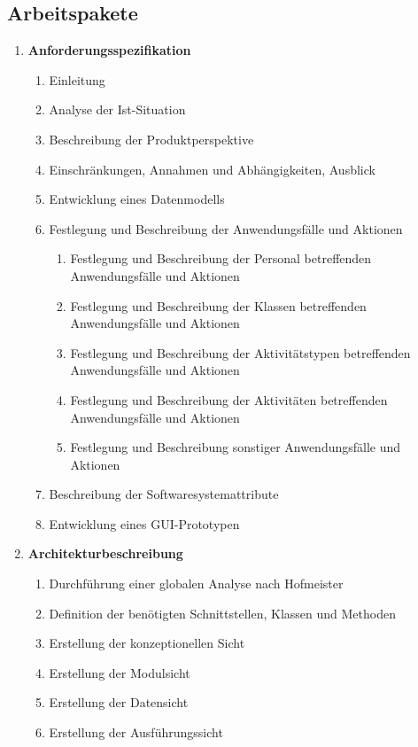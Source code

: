 \documentclass[fontsize=12pt,paper=a4,twoside]{scrartcl}
\begin{document}
\subsection{Arbeitspakete}\label{aps}


\begin{enumerate}
\item \textbf{Anforderungsspezifikation}
	\begin{enumerate}[label={(\arabic*)}]
	\item Einleitung
	\item Analyse der Ist-Situation
	\item Beschreibung der Produktperspektive
	\item Einschränkungen, Annahmen und Abhängigkeiten, Ausblick
	\item Entwicklung eines Datenmodells
	\item Festlegung und Beschreibung der Anwendungsfälle und Aktionen
		\begin{enumerate}[label={(\arabic*)}]
		\item Festlegung und Beschreibung der Personal betreffenden Anwendungsfälle und Aktionen
		\item Festlegung und Beschreibung der Klassen betreffenden Anwendungsfälle und Aktionen
		\item Festlegung und Beschreibung der Aktivitätstypen betreffenden Anwendungsfälle und Aktionen
		\item Festlegung und Beschreibung der Aktivitäten betreffenden Anwendungsfälle und Aktionen
		\item Festlegung und Beschreibung sonstiger Anwendungsfälle und Aktionen
		\end{enumerate}
	\item Beschreibung der Softwaresystemattribute	
	\item Entwicklung eines GUI-Prototypen
	\end{enumerate}	
\item \textbf{Architekturbeschreibung}
	\begin{enumerate}[label={(\arabic*)}]
	\item Durchführung einer globalen Analyse nach Hofmeister
	\item Definition der benötigten Schnittstellen, Klassen und Methoden
	\item Erstellung der konzeptionellen Sicht
	\item Erstellung der Modulsicht
	\item Erstellung der Datensicht
	\item Erstellung der Ausführungssicht

\end{enumerate}
\end{enumerate}
\end{document}
